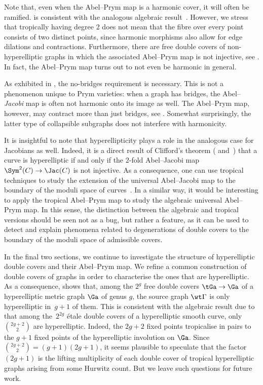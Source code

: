 Note that, even when  the Abel--Prym map is a  harmonic cover, it will often be ramified. 
 is consistent with the analogous algebraic result~\cite[Proposition~12.5.2(b)]{BL04}. 
However, we stress that tropically having degree 2 does not mean that the fibre over every point consists of two distinct points, since harmonic morphisms also allow for edge dilations and contractions. 
Furthermore, 
there are free double covers of non-hyperelliptic graphs in which the associated Abel--Prym map is not injective, see . In fact, the Abel--Prym map turns out to not even be harmonic in general. 


As exhibited in , the no-bridges requirement is necessary. This is not a phenomenon 
unique to Prym varieties: when a graph has bridges, the Abel--\emph{Jacobi} map is often not harmonic onto its image as well. The Abel--Prym map, however, may contract more than just bridges, see .
Somewhat surprisingly, the latter type of collapsible subgraphs does not interfere with harmonicity. 
    

It is insightful to note that hyperellipticity plays a role in the analogous case for Jacobians as well. Indeed,  it is a direct result of Clifford's theorem (\cite[Chapter III]{ACGHI}  and~\cite{Coppens_Clifford,Len_Clifford}) that a curve is  hyperelliptic if and only if the $2$-fold Abel--Jacobi map $\Sym^2(C)\to\Jac(C)$ is not injective. As a consequence, one can use  tropical techniques to study the extension of the  
universal Abel--Jacobi map to the boundary of the moduli space of curves~\cite{AbreuAndriaPacini_AbelMaps}. In a similar way, it would be interesting to apply the tropical Abel--Prym map to study the algebraic universal Abel--Prym map. 
In this sense, the distinction between the algebraic and tropical versions should be seen not as a bug, but rather a feature, as it can be used to detect and explain phenomena related to  degenerations of double covers to the boundary of the moduli space of admissible covers. 


In the final two sections, we continue to investigate the structure of hyperelliptic double covers and their Abel--Prym map. We refine a common construction of double covers of graphs in order to characterise the ones that are hyperelliptic. 
As a consequence,   shows that, among the $2^g$ free double covers $\tGa\to \Ga$ of a hyperelliptic metric graph $\Ga$ of genus $g$, the source graph $\wt\Gamma$ is only hyperelliptic in~$g+1$ of them. 
This is consistent with the algebraic result due to~\cite{HMfarkashypcovers} that among the~$2^{2g}$ \'etale double covers of a hyperelliptic smooth curve, only $\binom{2g+2}{2}$ are hyperelliptic. Indeed, the $2g+2$ fixed points tropicalise in pairs to the $g+1$ fixed points of the hyperelliptic involution on $\Ga$.
Since $\binom{2g+2}{2}=(g+1)(2g+1)$, it seems plausible to speculate that the factor $(2g+1)$ is the lifting multiplicity of each double cover of  tropical hyperelliptic graphs arising from some Hurwitz count. But we leave such questions for future work. 



